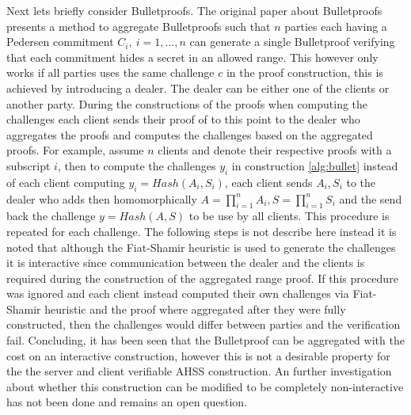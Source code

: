 Next lets briefly consider Bulletproofs. The original paper about Bulletproofs \cite{bulletProofs_theory} presents a method to aggregate Bulletproofs such that $n$ parties each having a Pedersen commitment $C_i,\: i=1,...,n$ can generate a single Bulletproof verifying that each commitment hides a secret in an allowed range. This however only works if all parties uses the same challenge $c$ in the proof construction, this is achieved by introducing a dealer. The dealer can be either one of the clients or another party. During the constructions of the proofs when computing the challenges each client sends their proof of to this point to the dealer who aggregates the proofs and computes the challenges based on the aggregated proofs. For example, assume $n$ clients and denote their respective proofs with a subscript $i$, then to compute the challenges $y_i$ in construction \ref{alg:bullet} instead of each client computing $y_i = Hash(A_i,S_i)$, each client sends $A_i,S_i$ to the dealer who adds then homomorphically $A = \prod_{i=1}^n A_i, S = \prod_{i=1}^n S_i$ and the send back the challenge $y =Hash(A,S)$ to be use by all clients. This procedure is repeated for each challenge. The following steps is not describe here instead it is noted that although the Fiat-Shamir heuristic is used to generate the challenges it is interactive since communication between the dealer and the clients is required during the construction of the aggregated range proof. If this procedure was ignored and each client instead computed their own challenges via Fiat-Shamir heuristic and the proof where aggregated after they were fully constructed,  then the challenges would differ between parties and the verification fail. Concluding, it has been seen that the  Bulletproof can be aggregated with the cost on an  interactive construction, however this is not a desirable property for the the server and client verifiable AHSS construction. An further investigation about whether this construction can be modified to be completely non-interactive  has not been done and remains an open question.  


